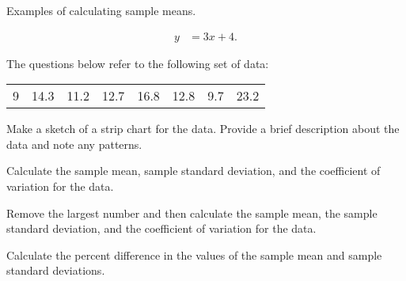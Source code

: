 

\begin{problem}
\item Examples of calculating sample means.

  \begin{subproblem}
  \item 
    \begin{eqnarray}
      y & = 3x + 4.
    \end{eqnarray}
    \vfill
  \end{subproblem}


\end{problem}




\begin{problem}

\item The  questions below refer to the following set of data: \\
  \begin{tabular}{rrrrrrrr}
    9 & 14.3 & 11.2 & 12.7 & 16.8 & 12.8 & 9.7 & 23.2
  \end{tabular}

  \begin{subproblem}
  \item Make a sketch of a strip chart for the data. Provide a brief
    description about the data and note any patterns.

    \vspace{8em}


  \item Calculate the sample mean, sample standard deviation, and the
    coefficient of variation for the data.

    \vfill

  \item Remove the largest number and then calculate the sample mean,
    the sample standard deviation, and the coefficient of variation
    for the data.

    \vfill

  \item Calculate the percent difference in the values of the sample
    mean and sample standard deviations.

    \vspace{4em}

  \end{subproblem}

  \clearpage


\end{problem}
